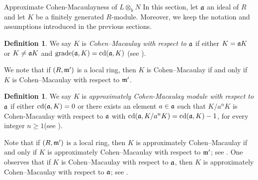 \documentclass[10pt,a4paper]{amsart}
\makeatletter
\numberwithin{equation}{theorem}
\theoremstyle{definition}
\newtheorem{definition}[theorem]{Definition}
\theoremstyle{fact}
\theoremstyle{conjecture}
\newcommand{\grade}{\operatorname{grade}}
\newcommand{\cd}{\operatorname{cd}}
\newcommand{\fm}{\frak{m}}
\newcommand{\fa}{\frak{a}}
\def\section{\@startsection{section}{1}%
\z@{.7\linespacing\@plus\linespacing}{.5\linespacing}%
{\normalfont\Large\bfseries\filcenter}}
\makeatother
\begin{document}
\section{Approximate Cohen-Macaulayness of $L\otimes_{\Bbbk} N$}
In this section, let $\fa$ an ideal of $R$ and let $K$ be a finitely generated $R$-module.
Moreover, we keep the notation and assumptions introduced in the previous sections.
\begin{definition}
\label{4.1} We say $K$ is {\it Cohen--Macaulay with respect to $\fa$} if either $K=\fa K$ or $K\neq \fa K$
and $\grade(\fa, K)=\cd(\fa, K)$ (see \cite{R1}).
\end{definition}
We note that if $(R, \fm')$ is a local ring,
 then $K$ is Cohen–Macaulay if and only if $K$ is Cohen–Macaulay with respect to $\fm'$.

\begin{definition}
\label{4.2}
We say $K$ is \emph{approximately Cohen-Macaulay module with respect to \( \fa \)} if either $\cd(\fa, K)=0$ or there exists an element $a\in \fa$
 such that $K/a^nK$ is Cohen-Macaulay with respect to $\fa $ with $\cd(\fa, K/a^nK)=\cd(\fa, K)-1$, for every integer $n\geq 1$(see \cite{FR}).
\end{definition}
Note that if \((R,\fm')\) is a local ring, then \(K\) is approximately Cohen--Macaulay if and only if \(K\) is approximately Cohen--Macaulay with respect to \(\fm'\); see \cite{G,S}.
One observes that if \(K\) is Cohen--Macaulay with respect to \(\fa\), then \(K\) is approximately Cohen--Macaulay with respect to \(\fa\); see \cite[Proposition 2.4]{FR}.
\end{document}
